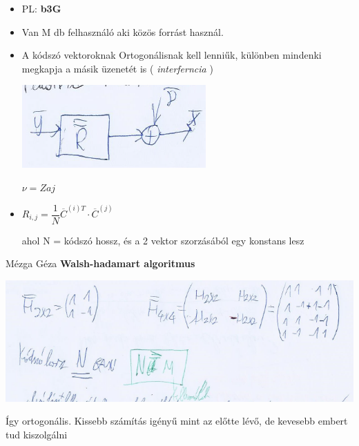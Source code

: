 \begin{enumerate}
			\begin{itemize}
				\item PL: \textbf{b3G}

				\item Van M db felhasználó aki közös forrást használ.

				\item A kódszó vektoroknak Ortogonálisnak kell lenniűk, különben mindenki megkapja a másik üzenetét is ( \textit{interferncia} )

				\begin{center}
					\includegraphics[scale=0.8]{img/CDMA3}

					$\nu = Zaj$
				\end{center}

				\item $R_{i,j} = \dfrac{1}{N} \overline{C}^{(i)T} \cdot \overline{C}^{(j)}$

				ahol N = kódszó hossz, és a 2 vektor szorzásából egy konstans lesz


			\end{itemize}
		\begin{definicio}{Mézga Géza} \textbf{Walsh-hadamart algoritmus}
			\begin{center}
				\includegraphics[scale=0.8]{img/CDMA4}
			\end{center}
			Így ortogonális. Kissebb számítás igényű mint az előtte lévő, de kevesebb embert tud kiszolgálni
    \end{definicio}

	\end{enumerate}
